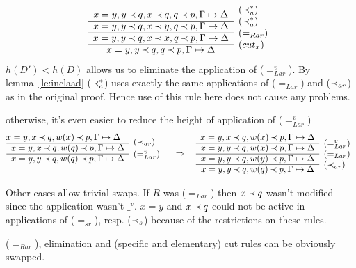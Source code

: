 \begin{PROOF}
\begin{LS}
\begin{LSA}
\begin{LSB}
\[\begin{array}{cl}
x=y, y\Incl q, x\Incl q, q\Incl p, \GSD & \raisebox{1.2ex}[1.5ex][0ex]{($\Incl_a^*$)} \\ \cline{1-1}
x=y, y\Incl q, x\Incl y, q\Incl p, \GSD & \raisebox{1.2ex}[1.5ex][0ex]{($\Incl_a^*$)} \\ \cline{1-1}
x=y, y\Incl q, x\Incl x, q\Incl p, \GSD & \raisebox{1.2ex}[1.5ex][0ex]{($=_{Rar}$)} \\ \cline{1-1}
x=y, y\Incl q, q\Incl p, \GSD & \raisebox{1.2ex}[1.5ex][0ex]{($cut_x$)} 
\end{array}
\]
$h(D')<h(D)$ allows us to eliminate the application of ($=_{Lar}^v$). 
By lemma~\ref{le:inclaad}
($\mathbin{\prec}_a^*$) uses exactly the same applications of
($=_{Lar}$) and ($\mathbin{\prec}_{ar}$) as in the original proof. Hence use of this rule here does not
cause any problems.
\item otherwise, it's even easier to reduce the height of application of ($=_{Lar}^v$)
\[ \begin{array}{cl} \hspace*{-1em}
x=y, x\Incl q, w(x)\Incl p,\GSD  &\raisebox{-1.2ex}[1.5ex][0ex]{($\Incl_{ar}$)}\\ \cline{1-1}
x=y, x\Incl q, w(q)\Incl p, \GSD &  \\ \cline{1-1}
x=y, y\Incl q, w(q)\Incl p, \GSD & \raisebox{1.2ex}[1.5ex][0ex]{($=_{Lar}^v$)} \\  \ 
\end{array}
\conv
\begin{array}{cl}
x=y, x\Incl q, w(x)\Incl p,\GSD  \\ \cline{1-1}
x=y, y\Incl q, w(x)\Incl p,\GSD  & \raisebox{1.2ex}[1.5ex][0ex]{($=_{Lar}^v$)} \\ \cline{1-1}
x=y, y\Incl q, w(y)\Incl p,\GSD  & \raisebox{1.2ex}[1.5ex][0ex]{($=_{Lar}$)} \\ \cline{1-1}
x=y, y\Incl q, w(q)\Incl p,\GSD  & \raisebox{1.2ex}[1.5ex][0ex]{($\Incl_{ar}$)} 
\end{array}
\]
\end{LSB}
\item\label{caseAB} 
Other cases allow trivial swaps. If $R$ was ($=_{Lar}$) then $x\mathbin{\prec} q$ wasn't modified
since the application wasn't $\_^v$. 
$x=y$ and $x\mathbin{\prec} q$ could not be active in 
applications of ($=_{sr}$), resp. ($\mathbin{\prec}_s$) because of the restrictions on these rules.

($=_{Rar}$), elimination and (specific and elementary) cut rules can be obviously swapped.
\end{LSA}


\end{LS}
\end{PROOF}
